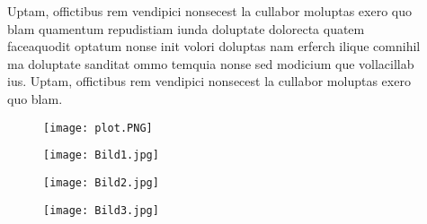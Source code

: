 \documentclass[final]{beamer}
\newlength{\sepwid}
\newlength{\onecolwid}
\begin{document}
\begin{frame}[t]
\begin{columns}[t]
\begin{column}{\onecolwid}
         \end{column}
                  
                  
                  
         \begin{column}{\sepwid}  \end{column}
         
         
         
         
         \begin{column}{\onecolwid} %
         
         \begin{block}{\vspace*{2.7cm}}
          Uptam, offictibus rem vendipici nonsecest la cullabor moluptas exero quo blam quamentum repudistiam iunda doluptate dolorecta quatem faceaquodit optatum nonse init volori doluptas nam erferch ilique comnihil ma doluptate sanditat ommo temquia nonse sed modicium que vollacillab ius. Uptam, offictibus rem vendipici nonsecest la cullabor moluptas exero quo blam.
          \end{block}
          
          \begin{block}{ }
				\begin{figure}
                	\vspace*{-1cm}
                    \texttt{[image: plot.PNG]}
				\end{figure}
				\begin{figure}
                    \texttt{[image: Bild1.jpg]}
				\end{figure}
                
                \begin{multicols}{2}
                \begin{figure}
                	\vspace*{-0.95cm}
                    \texttt{[image: Bild2.jpg]}
				\end{figure}
                \begin{figure}
                	\vspace*{-0.95cm}
                    \texttt{[image: Bild3.jpg]}
				\end{figure}
                \end{multicols}
                

\end{block}
\end{column}
\end{columns}
\end{frame}
\end{document}
